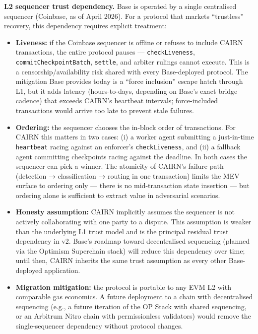 \documentclass[
  10pt,
]{article}
\providecommand{\tightlist}{%
  \setlength{\itemsep}{0pt}\setlength{\parskip}{0pt}}
\begin{document}
\textbf{L2 sequencer trust dependency.} Base is operated by a single
centralised sequencer (Coinbase, as of April 2026). For a protocol that
markets ``trustless'' recovery, this dependency requires explicit
treatment:

\begin{itemize}
\tightlist
\item
  \textbf{Liveness:} if the Coinbase sequencer is offline or refuses to
  include CAIRN transactions, the entire protocol pauses ---
  \texttt{checkLiveness}, \texttt{commitCheckpointBatch},
  \texttt{settle}, and arbiter rulings cannot execute. This is a
  censorship/availability risk shared with every Base-deployed protocol.
  The mitigation Base provides today is a ``force inclusion'' escape
  hatch through L1, but it adds latency (hours-to-days, depending on
  Base's exact bridge cadence) that exceeds CAIRN's heartbeat intervals;
  force-included transactions would arrive too late to prevent stale
  failures.
\item
  \textbf{Ordering:} the sequencer chooses the in-block order of
  transactions. For CAIRN this matters in two cases: (i) a worker agent
  submitting a just-in-time \texttt{heartbeat} racing against an
  enforcer's \texttt{checkLiveness}, and (ii) a fallback agent
  committing checkpoints racing against the deadline. In both cases the
  sequencer can pick a winner. The atomicity of CAIRN's failure path
  (detection → classification → routing in one transaction) limits the
  MEV surface to ordering only --- there is no mid-transaction state
  insertion --- but ordering alone is sufficient to extract value in
  adversarial scenarios.
\item
  \textbf{Honesty assumption:} CAIRN implicitly assumes the sequencer is
  not actively collaborating with one party to a dispute. This
  assumption is weaker than the underlying L1 trust model and is the
  principal residual trust dependency in v2. Base's roadmap toward
  decentralised sequencing (planned via the Optimism Superchain stack)
  will reduce this dependency over time; until then, CAIRN inherits the
  same trust assumption as every other Base-deployed application.
\item
  \textbf{Migration mitigation:} the protocol is portable to any EVM L2
  with comparable gas economics. A future deployment to a chain with
  decentralised sequencing (e.g., a future iteration of the OP Stack
  with shared sequencing, or an Arbitrum Nitro chain with permissionless
  validators) would remove the single-sequencer dependency without
  protocol changes.
\end{itemize}
\end{document}
